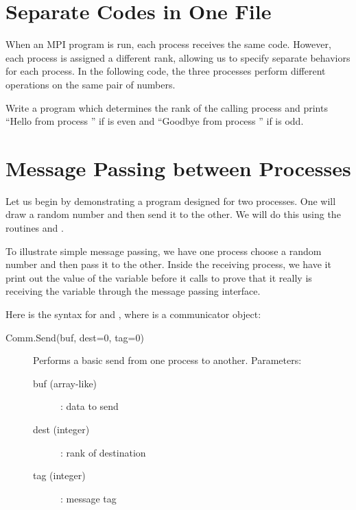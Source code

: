 \section*{Separate Codes in One File}
When an MPI program is run, each process receives the same code.
However, each process is assigned a different rank, allowing us to specify separate behaviors for each process.
In the following code, the three processes perform different operations on the same pair of numbers.


\begin{problem}
Write a program which determines the rank  of the calling process and prints ``Hello from process '' if  is even and ``Goodbye from process '' if  is odd.
\end{problem}

\section*{Message Passing between Processes}
Let us begin by demonstrating a program designed for two processes.
One will draw a random number and then send it to the other.
We will do this using the routines  and .



To illustrate simple message passing, we have one process choose a random number and then pass it to the other.
Inside the receiving process, we have it print out the value of the variable  before it calls  to prove that it really is receiving the variable through the message passing interface.

Here is the syntax for  and , where  is a communicator object:

\begin{description}
\item[Comm.Send(buf, dest=0, tag=0)]
Performs a basic send from one process to another.
Parameters:
\begin{description}
\item[buf (array-like)]: data to send
\item[dest (integer)]: rank of destination
\item[tag (integer)]: message tag
\end{description}
\end{description}

